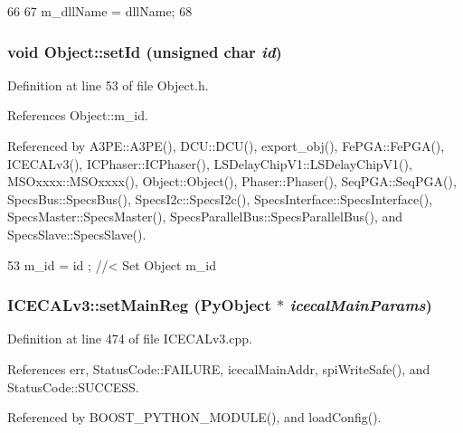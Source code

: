 \begin{DoxyCode}
66                                       {
67     m_dllName = dllName;
68   }
\end{DoxyCode}
\hypertarget{classObject_a398fe08cba594a0ce6891d59fe4f159f}{
\subsubsection[{setId}]{\setlength{\rightskip}{0pt plus 5cm}void Object::setId (unsigned char {\em id})}}
\label{classObject_a398fe08cba594a0ce6891d59fe4f159f}


Definition at line 53 of file Object.h.

References Object::m\_\-id.

Referenced by A3PE::A3PE(), DCU::DCU(), export\_\-obj(), FePGA::FePGA(), ICECALv3(), ICPhaser::ICPhaser(), LSDelayChipV1::LSDelayChipV1(), MSOxxxx::MSOxxxx(), Object::Object(), Phaser::Phaser(), SeqPGA::SeqPGA(), SpecsBus::SpecsBus(), SpecsI2c::SpecsI2c(), SpecsInterface::SpecsInterface(), SpecsMaster::SpecsMaster(), SpecsParallelBus::SpecsParallelBus(), and SpecsSlave::SpecsSlave().


\begin{DoxyCode}
53 { m_id    = id    ; } //< Set Object m_id
\end{DoxyCode}
\hypertarget{classICECALv3_a479f7e17669da4b785af840049d39cb4}{
\subsubsection[{setMainReg}]{ ICECALv3::setMainReg (PyObject $\ast$ {\em icecalMainParams})}}
\label{classICECALv3_a479f7e17669da4b785af840049d39cb4}


Definition at line 474 of file ICECALv3.cpp.

References err, StatusCode::FAILURE, icecalMainAddr, spiWriteSafe(), and StatusCode::SUCCESS.

Referenced by BOOST\_\-PYTHON\_\-MODULE(), and loadConfig().


